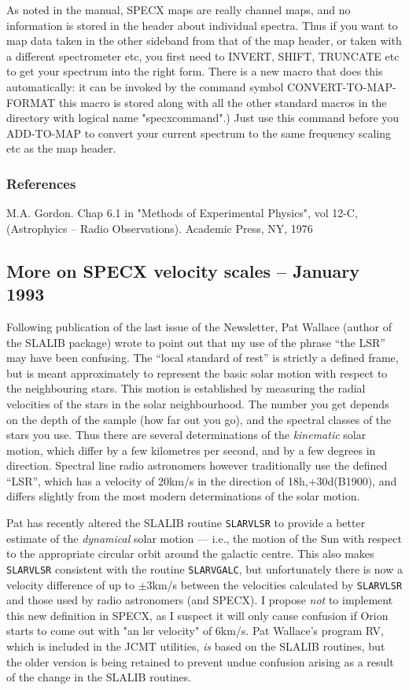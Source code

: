 \documentclass[twoside,11pt]{article}
\newcommand{\xref}[3]{#1}
\renewcommand{\_}{\texttt{\symbol{95}}}
\begin{document}
As noted in the manual, SPECX maps are really channel maps, and no information
is stored in the header about individual spectra. Thus if you want to map data
taken in the other sideband from that of the map header, or taken with a
different spectrometer etc, you first need to INVERT, SHIFT, TRUNCATE etc to
get your spectrum into the right form. There is a new macro that does this
automatically: it can be invoked by the command symbol CONVERT-TO-MAP-FORMAT
this macro is stored along with all the other standard macros in the directory
with logical name "specx\_command".) Just use this command before you
ADD-TO-MAP to convert your current spectrum to the same frequency scaling etc
as the map header.

\subsubsection{References}

M.A. Gordon. Chap 6.1 in "Methods of Experimental Physics", vol 12-C,
    (Astrophyics -- Radio Observations). Academic Press, NY, 1976


\subsection{More on SPECX velocity scales -- January 1993}

Following publication of the last issue of the Newsletter, Pat Wallace (author
of the \xref{SLALIB}{sun67}{} package) wrote to point out that my use of the
phrase ``the LSR'' may have been confusing. The ``local standard of rest'' is
strictly a defined frame, but is meant approximately to represent the basic
solar motion with respect to the neighbouring stars. This motion is
established by measuring the radial velocities of the stars in the solar
neighbourhood. The number you get depends on the depth of the sample (how far
out you go), and the spectral classes of the stars you use. Thus there are
several determinations of the \emph{kinematic} solar motion, which differ by a
few kilometres per second, and by a few degrees in direction. Spectral line
radio astronomers however traditionally use the defined ``LSR'', which has a
velocity of 20km/s in the direction of 18h,+30d(B1900), and differs slightly
from the most modern determinations of the solar motion.

Pat has recently altered the SLALIB routine \texttt{SLA\_RVLSR} to provide a
better estimate of the {\em dynamical} solar motion --- i.e., the motion of
the Sun with respect to the appropriate circular orbit around the galactic
centre.  This also makes \texttt{SLA\_RVLSR} consistent with the routine
\texttt{SLA\_RVGALC}, but unfortunately there is now a velocity difference of
up to $\pm 3$km/s between the velocities calculated by \texttt{SLA\_RVLSR} and
those used by radio astronomers (and SPECX). I propose {\em not} to implement
this new definition in SPECX, as I suspect it will only cause confusion if
Orion starts to come out with "an lsr velocity" of 6km/s. Pat Wallace's
program \xref{RV}{sun78}{}, which is included in the JCMT utilities, {\em is}
based on the SLALIB routines, but the older version is being retained to
prevent undue confusion arising as a result of the change in the SLALIB
routines.
\end{document}
